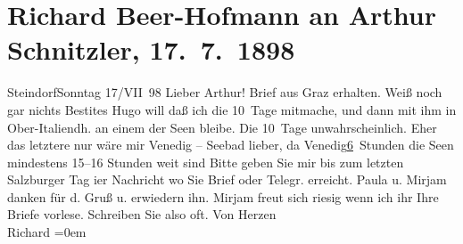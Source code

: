 

         
         \renewcommand{\erwaehntePersonen}{Personen: Paula Beer-Hofmann, Mirjam Beer-Hofmann, Hugo von Hofmannsthal}
         \renewcommand{\erwaehnteOrte}{Orte: Bad Gastein, Graz, Italien, Salzburg, Steindorf am Ossiacher See, Venedig}
         \renewcommand{\erwaehnteWerke}{}
               \section[Richard Beer-Hofmann an Arthur Schnitzler, 17. 7. 1898]{ Richard Beer-Hofmann an Arthur Schnitzler, 17. 7. 1898}\nopagebreak{}\rehead{ }\begin{ledgroupsized}[t]{13cm}\normalsize\beginnumbering \toendnotes[C]{\smallbreak\pagebreak[2]} 
\pstart
           \raggedleft{}{\pb}SteindorfSonntag 17/VII 98\pend
           \pstart
           Lieber Arthur! Brief aus Graz
               erhalten. Weiß noch gar nichts Besti{\geminationm}tes\pend
           \pstart
           Hugo will daß ich die 10 Tage mitmache, und dann
               mit ihm in Ober-Italiendh. an einem der Seen bleibe. Die
               10 Tage unwahrscheinlich. Eher das letztere nur wäre mir Venedig – Seebad lieber, da Venedig\uline{6} Stunden die Seen mindestens 15–16 {\pb}Stunden weit sind\pend
           \pstart
           Bitte geben Sie mir bis zum letzten Salzburger Tag
                  i{\geminationm}er Nachricht wo Sie Brief oder Telegr.
               erreicht.\pend
           \pstart
           Paula u. Mirjam dan{\pb}ken für d. Gruß
               u. erwiedern ihn. Mirjam freut sich riesig wenn
               ich ihr Ihre Briefe vorlese. Schreiben Sie also oft.\pend
           \pstart
           Von Herzen{\\[\baselineskip]}\spacefill\mbox{Richard}\pend
           \leftskip=0em{}
         
         \endnumbering{}\end{ledgroupsized}  \newcommand{\dateiname}{L00821}\newcommand{\titel}{Richard Beer-Hofmann an Arthur Schnitzler, 17. 7. 1898}\newcommand{\editorInnen}{Martin Anton Müller und Gerd-Hermann Susen}
      